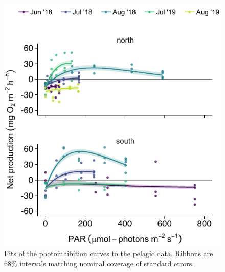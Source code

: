 \documentclass[12pt]{article}
\begin{document}
{\begin{figure}
\centering
\linespread{1}
\includegraphics{../analysis/figures/fig_nep_pel.pdf}
\caption{\label{fig:nep-pel}
Fits of the photoinhibition curves to the pelagic data.
Ribbons are 68\% intervals matching nominal coverage of standard errors.
}
\end{figure}

\clearpage





}
\end{document}

